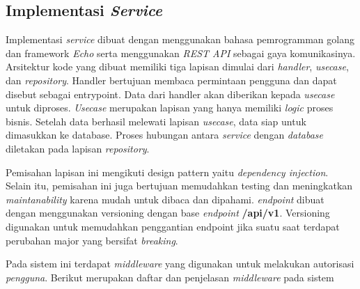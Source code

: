 \subsection{Implementasi \textit{Service}}

Implementasi \textit{service} dibuat dengan menggunakan bahasa pemrogramman golang dan framework \textit{Echo} serta menggunakan \textit{REST API} sebagai gaya komunikasinya. Arsitektur kode yang dibuat memiliki tiga lapisan dimulai dari \textit{handler}, \textit{usecase}, dan \textit{repository}. Handler bertujuan membaca permintaan pengguna dan dapat disebut sebagai entrypoint. Data dari handler akan diberikan kepada \textit{usecase} untuk diproses. \textit{Usecase} merupakan lapisan yang hanya memiliki \textit{logic} proses bisnis. Setelah data berhasil melewati lapisan \textit{usecase}, data siap untuk dimasukkan ke database. Proses hubungan antara \textit{service} dengan \textit{database} diletakan pada lapisan \textit{repository}.

Pemisahan lapisan ini mengikuti design pattern yaitu \textit{dependency injection}. Selain itu, pemisahan ini juga bertujuan memudahkan testing dan meningkatkan \textit{maintanability} karena mudah untuk dibaca dan dipahami. \textit{endpoint} dibuat dengan menggunakan versioning dengan base \textit{endpoint} \textbf{/api/v1}. Versioning digunakan untuk memudahkan penggantian endpoint jika suatu saat terdapat perubahan major yang bersifat \textit{breaking}.

Pada sistem ini terdapat \textit{middleware} yang digunakan untuk melakukan autorisasi \textit{pengguna}. Berikut merupakan daftar dan penjelasan \textit{middleware} pada sistem

